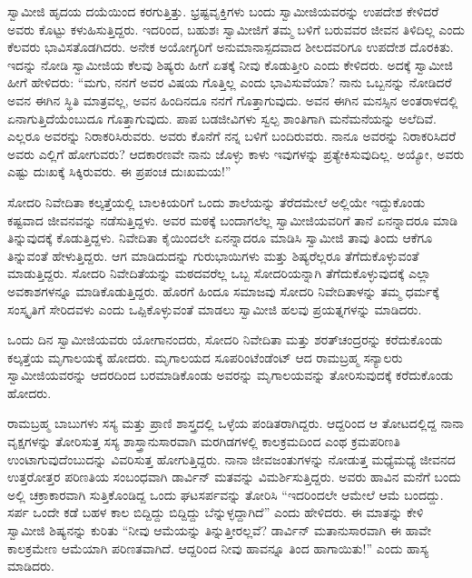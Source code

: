  ಸ್ವಾಮೀಜಿ ಹೃದಯ ದಯೆಯಿಂದ ಕರಗುತ್ತಿತ್ತು. ಭ್ರಷ್ಟವೃಕ್ತಿಗಳು ಬಂದು ಸ್ವಾಮೀಜಿಯವರನ್ನು ಉಪದೇಶ ಕೇಳಿದರೆ ಅವರು ಕೊಟ್ಟು ಕಳುಹಿಸುತ್ತಿದ್ದರು. ಇದರಿಂದ, ಬಹುಶಃ ಸ್ವಾಮೀಜಿಗೆ ತಮ್ಮ ಬಳಿಗೆ ಬರುವವರ ಜೀವನ ತಿಳಿದಿಲ್ಲ ಎಂದು ಕೆಲವರು ಭಾವಿಸತೊಡಗಿದರು. ಅನೇಕ ಅಯೋಗ್ಯರಿಗೆ ಅನುಮಾನಾಸ್ಪದವಾದ ಶೀಲದವರಿಗೂ ಉಪದೇಶ ದೊರಕಿತು. ಇದನ್ನು ನೋಡಿ ಸ್ವಾಮೀಜಿಯ ಕೆಲವು ಶಿಷ್ಯರು ಹೀಗೆ ಏತಕ್ಕೆ ನೀವು ಕೊಡುತ್ತೀರಿ ಎಂದು ಕೇಳಿದರು. ಅದಕ್ಕೆ ಸ್ವಾಮೀಜಿ ಹೀಗೆ ಹೇಳಿದರು: “ಮಗು, ನನಗೆ ಅವರ ವಿಷಯ ಗೊತ್ತಿಲ್ಲ ಎಂದು ಭಾವಿಸುವೆಯಾ? ನಾನು ಒಬ್ಬನನ್ನು ನೋಡಿದರೆ ಅವನ ಈಗಿನ ಸ್ಥಿತಿ ಮಾತ್ರವಲ್ಲ, ಅವನ ಹಿಂದಿನದೂ ನನಗೆ ಗೊತ್ತಾಗುವುದು. ಅವನ ಈಗಿನ ಮನಸ್ಸಿನ ಅಂತರಾಳದಲ್ಲಿ ಏನಾಗುತ್ತಿದೆಯೆಂಬುದೂ ಗೊತ್ತಾಗುವುದು. ಪಾಪ ಬಡಜೀವಿಗಳು ಸ್ವಲ್ಪ ಶಾಂತಿಗಾಗಿ ಮನೆಮನೆಯನ್ನು ಅಲೆದಿವೆ. ಎಲ್ಲರೂ ಅವರನ್ನು ನಿರಾಕರಿಸಿರುವರು. ಅವರು ಕೊನೆಗೆ ನನ್ನ ಬಳಿಗೆ ಬಂದಿರುವರು. ನಾನೂ ಅವರನ್ನು ನಿರಾಕರಿಸಿದರೆ ಅವರು ಎಲ್ಲಿಗೆ ಹೋಗುವರು? ಆದಕಾರಣವೇ ನಾನು ಜೊಳ್ಳು ಕಾಳು ಇವುಗಳನ್ನು ಪ್ರತ್ಯೇಕಿಸುವುದಿಲ್ಲ. ಅಯ್ಯೋ, ಅವರು ಎಷ್ಟು ದುಃಖಕ್ಕೆ ಸಿಕ್ಕಿರುವರು. ಈ ಪ್ರಪಂಚ ದುಃಖಮಯ!” 

\newpage

 ಸೋದರಿ ನಿವೇದಿತಾ ಕಲ್ಕತ್ತೆಯಲ್ಲಿ ಬಾಲಕಿಯರಿಗೆ ಒಂದು ಶಾಲೆಯನ್ನು ತೆರೆದಮೇಲೆ ಅಲ್ಲಿಯೇ ಇದ್ದುಕೊಂಡು ಕಷ್ಟವಾದ ಜೀವನವನ್ನು ನಡೆಸುತ್ತಿದ್ದಳು. ಅವರ ಮಠಕ್ಕೆ ಬಂದಾಗಲೆಲ್ಲ ಸ್ವಾಮೀಜಿಯವರಿಗೆ ತಾನೆ ಏನನ್ನಾದರೂ ಮಾಡಿ ತಿನ್ನುವುದಕ್ಕೆ ಕೊಡುತ್ತಿದ್ದಳು. ನಿವೇದಿತಾ ಕೈಯಿಂದಲೇ ಏನನ್ನಾದರೂ ಮಾಡಿಸಿ ಸ್ವಾಮೀಜಿ ತಾವು ತಿಂದು ಆಕೆಗೂ ತಿನ್ನುವಂತೆ ಹೇಳುತ್ತಿದ್ದರು. ಆಗ ಮಾಡಿದುದನ್ನು ಗುರುಭಾಯಿಗಳು ಮತ್ತು ಶಿಷ್ಯರೆಲ್ಲರೂ ತೆಗೆದುಕೊಳ್ಳುವಂತೆ ಮಾಡುತ್ತಿದ್ದರು. ಸೋದರಿ ನಿವೇದಿತೆಯನ್ನು ಮಠದವರೆಲ್ಲ ಒಬ್ಬ ಸೋದರಿಯನ್ನಾಗಿ ತೆಗೆದುಕೊಳ್ಳುವುದಕ್ಕೆ ಎಲ್ಲಾ ಅವಕಾಶಗಳನ್ನೂ ಮಾಡಿಕೊಡುತ್ತಿದ್ದರು. ಹೊರಗೆ ಹಿಂದೂ‌ ಸಮಾಜವು ಸೋದರಿ ನಿವೇದಿತಾಳನ್ನು ತಮ್ಮ ಧರ್ಮಕ್ಕೆ ಸಂಸ್ಕೃತಿಗೆ ಸೇರಿದವಳು ಎಂದು ಒಪ್ಪಿಕೊಳ್ಳುವಂತೆ ಮಾಡಲು ಸ್ವಾಮೀಜಿ ಹಲವು ಪ್ರಯತ್ನಗಳನ್ನು ಮಾಡಿದರು. 

 ಒಂದು ದಿನ ಸ್ವಾಮೀಜಿಯವರು ಯೋಗಾನಂದರು, ಸೋದರಿ ನಿವೇದಿತಾ ಮತ್ತು ಶರತ್‍ಚಂದ್ರರನ್ನು ಕರೆದುಕೊಂಡು ಕಲ್ಕತ್ತೆಯ ಮೃಗಾಲಯಕ್ಕೆ ಹೋದರು. ಮೃಗಾಲಯದ ಸೂಪರಿಂಟೆಂಡೆಂಟ್ ಆದ ರಾಮಬ್ರಹ್ಮ ಸನ್ಯಾಲರು ಸ್ವಾಮೀಜಿಯವರನ್ನು ಆದರದಿಂದ ಬರಮಾಡಿಕೊಂಡು ಅವರನ್ನು ಮೃಗಾಲಯವನ್ನು ತೋರಿಸುವುದಕ್ಕೆ ಕರೆದುಕೊಂಡು ಹೋದರು. 

 ರಾಮಬ್ರಹ್ಮ ಬಾಬುಗಳು ಸಸ್ಯ ಮತ್ತು ಪ್ರಾಣಿ ಶಾಸ್ತ್ರದಲ್ಲಿ ಒಳ್ಳೆಯ ಪಂಡಿತರಾಗಿದ್ದರು. ಆದ್ದರಿಂದ ಆ ತೋಟದಲ್ಲಿದ್ದ ನಾನಾ ವೃಕ್ಷಗಳನ್ನು ತೋರಿಸುತ್ತ ಸಸ್ಯ ಶಾಸ್ತ್ರಾನುಸಾರವಾಗಿ ಮರಗಿಡಗಳಲ್ಲಿ ಕಾಲಕ್ರಮದಿಂದ ಎಂಥ ಕ್ರಮಪರಿಣತಿ ಉಂಟಾಗುವುದೆಂಬುದನ್ನು ವಿವರಿಸುತ್ತ ಹೋಗುತ್ತಿದ್ದರು. ನಾನಾ ಜೀವಜಂತುಗಳನ್ನು ನೋಡುತ್ತ ಮಧ್ಯೆಮಧ್ಯೆ ಜೀವನದ ಉತ್ತರೋತ್ತರ ಪರಿಣತಿಯ ಸಂಬಂಧವಾಗಿ ಡಾರ್ವಿನ್ ಮತವನ್ನು ವಿಮರ್ಶಿಸುತ್ತಿದ್ದರು. ಅವರು ಹಾವಿನ ಮನೆಗೆ ಬಂದು ಅಲ್ಲಿ ಚಕ್ರಾಕಾರವಾಗಿ ಸುತ್ತಿಕೊಂಡಿದ್ದ ಒಂದು ಘಟಸರ್ಪವನ್ನು ತೋರಿಸಿ “ಇದರಿಂದಲೇ ಆಮೇಲೆ ಆಮೆ ಬಂದದ್ದು. ಸರ್ಪ ಒಂದೇ ಕಡೆ ಬಹಳ ಕಾಲ ಬಿದ್ದಿದ್ದು ಬಿದ್ದಿದ್ದು ಬೆನ್ನುಳ್ಳದ್ದಾಗಿದೆ” ಎಂದು ಹೇಳಿದರು. ಈ ಮಾತನ್ನು ಕೇಳಿ ಸ್ವಾಮೀಜಿ ಶಿಷ್ಯನನ್ನು ಕುರಿತು “ನೀವು ಆಮೆಯನ್ನು ತಿನ್ನುತ್ತೀರಲ್ಲವೆ? ಡಾರ್ವಿನ್ ಮತಾನುಸಾರವಾಗಿ ಈ ಹಾವೇ ಕಾಲಕ್ರಮೇಣ ಆಮೆಯಾಗಿ ಪರಿಣತವಾಗಿದೆ. ಆದ್ದರಿಂದ ನೀವು ಹಾವನ್ನೂ ತಿಂದ ಹಾಗಾಯಿತು!” ಎಂದು ಹಾಸ್ಯ ಮಾಡಿದರು. 

